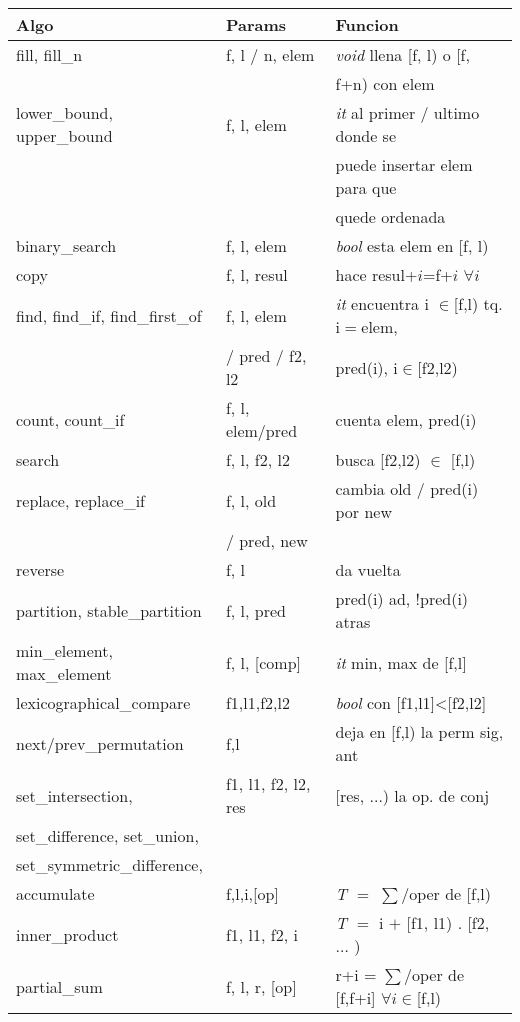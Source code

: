 \begin{tabular}{|l|l|p{5.4cm}|} \hline
\textbf{Algo} & \textbf{Params} &  \textbf{Funcion} \\  \hline
fill, fill\_n & f, l / n, elem & \textit{void} llena [f, l) o [f, \\ && f+n) con elem \\  \hline
lower\_bound, upper\_bound & f, l, elem & \textit{it} al primer / ultimo donde se \\ && puede insertar elem para que\\ && quede ordenada \\  \hline
binary\_search & f, l, elem & \textit{bool} esta elem en [f, l) \\  \hline
copy & f, l, resul & hace resul+$i$=f+$i$ $\forall i$ \\  \hline
find, find\_if, find\_first\_of & f, l, elem & \textit{it} encuentra i $\in$[f,l) tq. i$=$elem, \\ & / pred / f2, l2 & pred(i), i$\in$[f2,l2)\\\hline
count, count\_if & f, l, elem/pred & cuenta elem, pred(i)\\\hline
search & f, l, f2, l2 & busca [f2,l2) $\in$ [f,l)\\\hline
replace, replace\_if & f, l, old & cambia old / pred(i) por new \\ & / pred, new &\\\hline
reverse & f, l & da vuelta\\\hline
partition, stable\_partition & f, l, pred & pred(i) ad, !pred(i) atras\\\hline
min\_element, max\_element & f, l, [comp] & \textit{it} min, max de [f,l]\\\hline
lexicographical\_compare & f1,l1,f2,l2 & \textit{bool} con [f1,l1]<[f2,l2]\\\hline
next/prev\_permutation & f,l & deja en [f,l) la perm sig, ant\\\hline
set\_intersection, & f1, l1, f2, l2, res & [res, $\ldots$) la op. de conj\\
set\_difference, set\_union, & & \\
set\_symmetric\_difference, & &\\\hline
accumulate & f,l,i,[op] & \textit{T} $=$ $\sum$/oper de [f,l)\\\hline
inner\_product & f1, l1, f2, i & \textit{T} $=$ i $+$ [f1, l1) . [f2, $\ldots$ )\\\hline
partial\_sum & f, l, r, [op] & r+i = $\sum$/oper de [f,f+i] $\forall i \in$[f,l)\\\hline

\end{tabular}

